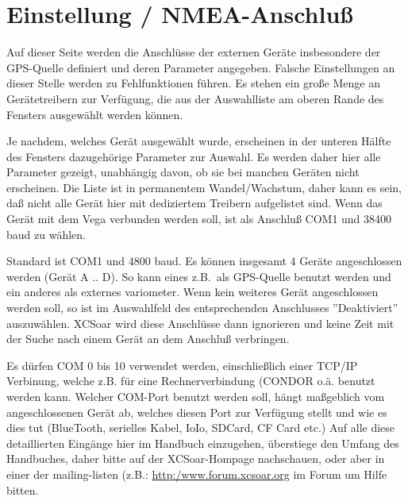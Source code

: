 \section{Einstellung / NMEA-Anschluß} \label{conf:comdevices}

Auf dieser Seite werden die Anschlüsse der externen Geräte insbesondere der GPS-Quelle definiert und deren Parameter
angegeben. Falsche Einstellungen an dieser Stelle werden zu Fehlfunktionen führen. Es stehen ein große Menge an Gerätetreibern zur Verfügung, die aus der Auswahlliste am
oberen Rande des Fensters ausgewählt werden können.

Je nachdem, welches Gerät ausgewählt wurde, erscheinen in der unteren Hälfte des Fensters dazugehörige
Parameter zur Auswahl. \achtung Es werden daher hier alle Parameter gezeigt, unabhängig davon, ob sie bei manchen Geräten nicht erscheinen.
Die Liste ist in permanentem Wandel/Wachstum, daher kann es sein, daß nicht alle Gerät hier mit dediziertem Treibern aufgelistet sind.
Wenn das Gerät mit dem Vega verbunden werden soll, ist als Anschluß COM1 und 38400 baud zu wählen.

Standard ist COM1 und 4800 baud. Es können insgesamt 4 Geräte angeschlossen werden (Gerät A .. D).
So kann eines z.B.\ als GPS-Quelle benutzt werden und ein anderes als externes variometer.
Wenn kein weiteres Gerät angeschlossen werden soll, so ist im Auswahlfeld des entsprechenden Anschlusses ''Deaktiviert'' auszuwählen.
\textsf{XCSoar} wird diese Anschlüsse dann ignorieren und keine Zeit mit der Suche nach einem Gerät an dem Anschluß verbringen.

Es dürfen COM 0 bis 10 verwendet werden,  einschließlich einer TCP/IP Verbinung, welche z.B. für eine
Rechnerverbindung (\textsc{CONDOR} o.ä. benutzt werden kann. Welcher COM-Port benutzt werden soll, hängt maßgeblich vom angeschlossenen Gerät ab,
welches diesen Port zur Verfügung stellt und wie es dies tut (BlueTooth, serielles Kabel, IoIo, SDCard, CF Card etc.) Auf alle diese detaillierten
Eingänge hier im Handbuch einzugehen, überstiege den Umfang des Handbuches, daher bitte auf der \textsf{XCSoar}-Hompage nachschauen, oder aber
in einer der mailing-listen  (z.B.:  \url{http:/www.forum.xcsoar.org} im Forum um Hilfe bitten.

